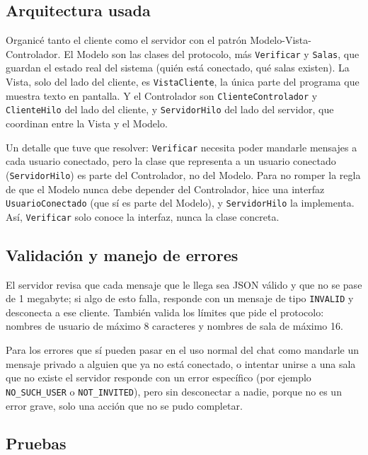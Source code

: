 \documentclass[12pt,letterpaper]{article}
\begin{document}
\subsection{Arquitectura usada}

Organicé tanto el cliente como el servidor con el patrón
Modelo-Vista-Controlador. El Modelo son las clases del protocolo, más
\texttt{Verificar} y \texttt{Salas}, que guardan el estado real del
sistema (quién está conectado, qué salas existen). La Vista, solo del
lado del cliente, es \texttt{VistaCliente}, la única parte del programa
que muestra texto en pantalla. Y el Controlador son
\texttt{ClienteControlador} y \texttt{ClienteHilo} del lado del
cliente, y \texttt{ServidorHilo} del lado del servidor, que coordinan
entre la Vista y el Modelo.

Un detalle que tuve que resolver: \texttt{Verificar} necesita poder
mandarle mensajes a cada usuario conectado, pero la clase que representa
a un usuario conectado (\texttt{ServidorHilo}) es parte del Controlador,
no del Modelo. Para no romper la regla de que el Modelo nunca debe
depender del Controlador, hice una interfaz \texttt{UsuarioConectado}
(que sí es parte del Modelo), y \texttt{ServidorHilo} la implementa.
Así, \texttt{Verificar} solo conoce la interfaz, nunca la clase
concreta.

\subsection{Validación y manejo de errores}

El servidor revisa que cada mensaje que le llega sea JSON válido y que
no se pase de 1 megabyte; si algo de esto falla, responde con un mensaje
de tipo \texttt{INVALID} y desconecta a ese cliente. También valida los
límites que pide el protocolo: nombres de usuario de máximo 8
caracteres y nombres de sala de máximo 16.

Para los errores que sí pueden pasar en el uso normal del chat como
mandarle un mensaje privado a alguien que ya no está conectado, o
intentar unirse a una sala que no existe el servidor responde con un
error específico (por ejemplo \texttt{NO\_SUCH\_USER} o
\texttt{NOT\_INVITED}), pero sin desconectar a nadie, porque no es un
error grave, solo una acción que no se pudo completar.

\subsection{Pruebas}
\end{document}
